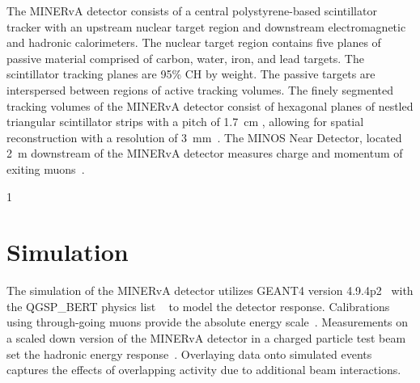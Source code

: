 \documentclass[aps,preprint,showpacs,superscriptaddress,letterpaper,showkeys,superscriptaddress,nofootinbib,floatfix]{revtex4-1}
\newcommand{\firstReviewAdd}[1]{{\bf\color{blue} \protect #1}}
\newcommand{\firstReviewStrike}[1]{{\bf\color{blue}\protect \sout{#1}}}
\newcommand{\firstRefereeAdd}[1]{{\bf\color{green} \protect #1}}
\newcommand{\firstRefereeStrike}[1]{{\bf\color{green}\protect \sout{#1}}}
\newcommand{\showSections}[0]{0}
\renewcommand{\firstReviewAdd}[1]{\protect #1}
\renewcommand{\firstReviewStrike}[1]{}
\renewcommand{\firstRefereeAdd}[1]{\protect #1}
\renewcommand{\firstRefereeStrike}[1]{}
\begin{document}
The MINERvA detector consists of a central polystyrene-based scintillator tracker with an upstream nuclear target region and downstream electromagnetic and hadronic calorimeters.  The nuclear target region contains five planes of passive material comprised of carbon, water, iron, and lead targets. \firstReviewAdd{The scintillator tracking planes are 95\% CH by weight.} 
The passive targets are interspersed between regions of active tracking volumes. The finely segmented tracking volumes of the MINERvA detector consist of hexagonal planes of \firstReviewAdd{nestled triangular scintillator strips with a pitch of 1.7~cm} \firstReviewStrike{1.7 cm wide scintillator strips}, allowing for spatial reconstruction with a resolution of 3~mm~\cite{Aliaga:2013uqz}.  The MINOS Near Detector, located 2~m downstream of the MINERvA detector\firstRefereeStrike{, serves as a muon spectrometer for exiting muons, allowing for the reconstruction of muon charge and momentum} \firstRefereeAdd{measures charge and momentum of exiting muons}~\cite{MINOS:2008hdf}. 

\if\showSections1 \section{Simulation} \fi
The simulation of the MINERvA detector utilizes GEANT4 version 4.9.4p2~\cite{Agostinelli:2002hh} with the QGSP\_BERT physics list ~\cite{Bertini:1968,Bertini:1971,Kaidalov:1982} to model the detector response. Calibrations using through-going muons provide the absolute energy scale~\cite{Aliaga:2013uqz}. Measurements on a scaled down version of the MINERvA detector in a charged particle test beam set the hadronic energy response~\cite{Aliaga:2015aqe}.  Overlaying data onto simulated events captures the effects of overlapping activity due to additional beam interactions.  
\end{document}
